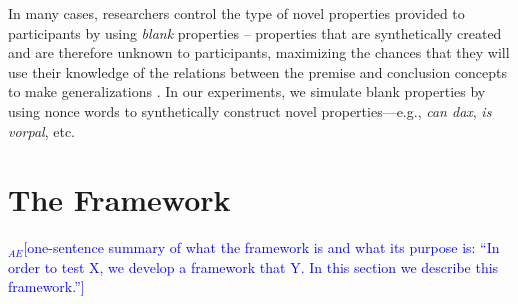 \documentclass[10pt,letterpaper]{article}
\newcommand{\ake}[1]{\textcolor{blue}{$_{AE}$[#1]}}
\newcommand{\km}[1]{\textcolor{purple}{$_{KM}$[#1]}}
\newcounter{argument}
\begin{document}
In many cases, researchers control the type of novel properties provided to participants by using \textit{blank} properties -- properties that are synthetically created and are therefore unknown to participants, maximizing the chances that they will use their knowledge of the relations between the premise and conclusion concepts to make generalizations \citep{rips1975inductive, osherson1990category, murphy2004big}. In our experiments, we simulate blank properties by using nonce words to synthetically construct novel properties---e.g., \textit{can dax}, \textit{is vorpal}, etc.

\section{The Framework}
\ake{one-sentence summary of what the framework is and what its purpose is: ``In order to test X, we develop a framework that Y. In this section we describe this framework.''}%
\end{document}
